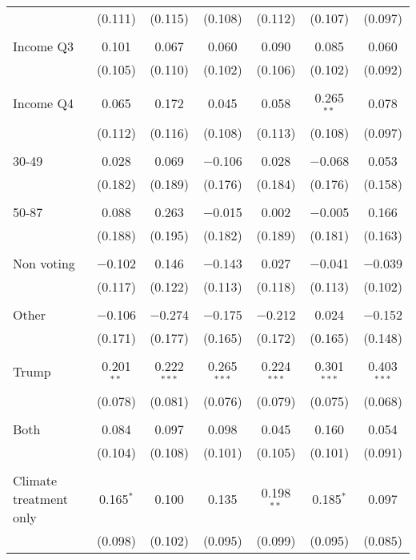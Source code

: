 \begin{tabular}{@{\extracolsep{5pt}}lcccccc}
  & (0.111) & (0.115) & (0.108) & (0.112) & (0.107) & (0.097) \\ 
  & & & & & & \\ 
 Income Q3 & 0.101 & 0.067 & 0.060 & 0.090 & 0.085 & 0.060 \\ 
  & (0.105) & (0.110) & (0.102) & (0.106) & (0.102) & (0.092) \\ 
  & & & & & & \\ 
 Income Q4 & 0.065 & 0.172 & 0.045 & 0.058 & 0.265$^{**}$ & 0.078 \\ 
  & (0.112) & (0.116) & (0.108) & (0.113) & (0.108) & (0.097) \\ 
  & & & & & & \\ 
 30-49 & 0.028 & 0.069 & $-$0.106 & 0.028 & $-$0.068 & 0.053 \\ 
  & (0.182) & (0.189) & (0.176) & (0.184) & (0.176) & (0.158) \\ 
  & & & & & & \\ 
 50-87 & 0.088 & 0.263 & $-$0.015 & 0.002 & $-$0.005 & 0.166 \\ 
  & (0.188) & (0.195) & (0.182) & (0.189) & (0.181) & (0.163) \\ 
  & & & & & & \\ 
 Non voting & $-$0.102 & 0.146 & $-$0.143 & 0.027 & $-$0.041 & $-$0.039 \\ 
  & (0.117) & (0.122) & (0.113) & (0.118) & (0.113) & (0.102) \\ 
  & & & & & & \\ 
 Other & $-$0.106 & $-$0.274 & $-$0.175 & $-$0.212 & 0.024 & $-$0.152 \\ 
  & (0.171) & (0.177) & (0.165) & (0.172) & (0.165) & (0.148) \\ 
  & & & & & & \\ 
 Trump & 0.201$^{**}$ & 0.222$^{***}$ & 0.265$^{***}$ & 0.224$^{***}$ & 0.301$^{***}$ & 0.403$^{***}$ \\ 
  & (0.078) & (0.081) & (0.076) & (0.079) & (0.075) & (0.068) \\ 
  & & & & & & \\ 
 Both & 0.084 & 0.097 & 0.098 & 0.045 & 0.160 & 0.054 \\ 
  & (0.104) & (0.108) & (0.101) & (0.105) & (0.101) & (0.091) \\ 
  & & & & & & \\ 
 Climate treatment only & 0.165$^{*}$ & 0.100 & 0.135 & 0.198$^{**}$ & 0.185$^{*}$ & 0.097 \\ 
  & (0.098) & (0.102) & (0.095) & (0.099) & (0.095) & (0.085) \\ 

\end{tabular}
